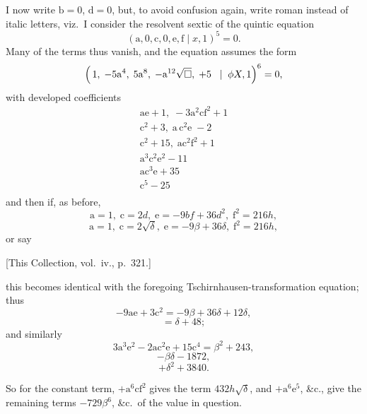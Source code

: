 \documentclass[11pt]{article}
\begin{document}
\medskip
I now write $\mathrm{b}=0$, $\mathrm{d}=0$, but, to avoid confusion
again, write roman instead of italic letters, viz.\ I consider the
resolvent sextic of the quintic equation
\[
  (\mathrm{a},0,\mathrm{c},0,\mathrm{e},\mathrm{f}\mid x,1)^{5}=0.
\]
Many of the terms thus vanish, and the equation assumes the form
\[
\Bigl(\,1,\;-5\mathrm{a}^{4},\;5\mathrm{a}^{8},\;-\mathrm{a}^{12}\sqrt{\square},\;+5\;\;\mid\;\phi X,1\Bigr)^{6}=0,
\]
with developed coefficients
\[
\begin{array}{l}
\mathrm{ae}+1,\;-3\mathrm{a}^{2}\mathrm{cf}^{2}+1\\
\mathrm{c}^{2}+3,\;\mathrm{a}\,\mathrm{c}^{2}\mathrm{e}\;-2\\
\mathrm{c}^{2}+15,\;\mathrm{ac}^{2}\mathrm{f}^{2}+1\\
\mathrm{a}^{3}\mathrm{c}^{2}\mathrm{e}^{2}-11\\
\mathrm{ac}^{3}\mathrm{e}+35\\
\mathrm{c}^{5}-25\\
\end{array}
\]
and then if, as before,
\[
  \mathrm{a}=1,\;\mathrm{c}=2d,\;\mathrm{e}=-9bf+36d^{2},\;\mathrm{f}^{2}=216h,
\]
\[
  \mathrm{a}=1,\;\mathrm{c}=2\sqrt{\delta},\;\mathrm{e}=-9\beta+36\delta,\;\mathrm{f}^{2}=216h,
\]
or say
\smallskip

\noindent\hfill *[This Collection, vol.~iv., p.~321.]\hfill\null

\newpage
\noindent
this becomes identical with the foregoing Tschirnhausen-transformation
equation; thus
\[
  -9\mathrm{ae}+3\mathrm{c}^{2}=-9\beta+36\delta+12\delta,
\]
\[
  =\delta+48;
\]
and similarly
\[
  3\mathrm{a}^{3}\mathrm{e}^{2}-2\mathrm{a}\mathrm{c}^{2}\mathrm{e}+15\mathrm{c}^{4}=\beta^{2}+243,
\]
\[
  -\beta\delta-1872,
\]
\[
  +\delta^{2}+3840.
\]

\medskip
So for the constant term, $+\mathrm{a}^{6}\mathrm{cf}^{2}$ gives
the term $432h\sqrt{\delta}$, and $+\mathrm{a}^{6}\mathrm{e}^{5}$,
\&c., give the remaining terms $-729\beta^{6}$, \&c.\ of the value
in question.
\end{document}
